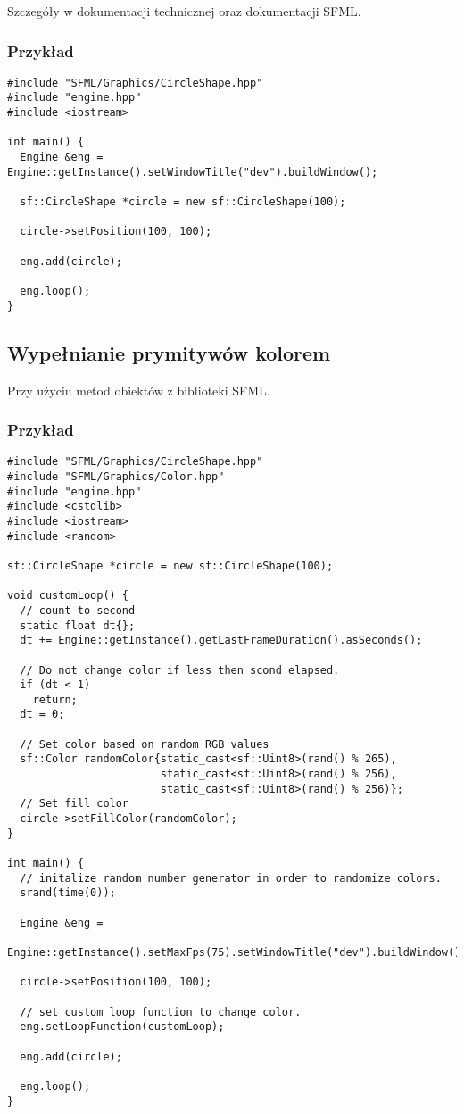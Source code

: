 \documentclass[11pt]{article}
\begin{document}
Szczegóły w dokumentacji technicznej oraz dokumentacji SFML.
\subsubsection{Przykład}
\label{sec:org96bf344}
\begin{verbatim}
#include "SFML/Graphics/CircleShape.hpp"
#include "engine.hpp"
#include <iostream>

int main() {
  Engine &eng = Engine::getInstance().setWindowTitle("dev").buildWindow();

  sf::CircleShape *circle = new sf::CircleShape(100);

  circle->setPosition(100, 100);

  eng.add(circle);

  eng.loop();
}
\end{verbatim}
\subsection{Wypełnianie prymitywów kolorem}
\label{sec:org820a780}
Przy użyciu metod obiektów z biblioteki SFML.
\subsubsection{Przykład}
\label{sec:org1ca8fe5}
\begin{verbatim}
#include "SFML/Graphics/CircleShape.hpp"
#include "SFML/Graphics/Color.hpp"
#include "engine.hpp"
#include <cstdlib>
#include <iostream>
#include <random>

sf::CircleShape *circle = new sf::CircleShape(100);

void customLoop() {
  // count to second
  static float dt{};
  dt += Engine::getInstance().getLastFrameDuration().asSeconds();

  // Do not change color if less then scond elapsed.
  if (dt < 1)
    return;
  dt = 0;

  // Set color based on random RGB values
  sf::Color randomColor{static_cast<sf::Uint8>(rand() % 265),
                        static_cast<sf::Uint8>(rand() % 256),
                        static_cast<sf::Uint8>(rand() % 256)};
  // Set fill color
  circle->setFillColor(randomColor);
}

int main() {
  // initalize random number generator in order to randomize colors.
  srand(time(0));

  Engine &eng =
      Engine::getInstance().setMaxFps(75).setWindowTitle("dev").buildWindow();

  circle->setPosition(100, 100);

  // set custom loop function to change color.
  eng.setLoopFunction(customLoop);

  eng.add(circle);

  eng.loop();
}
\end{verbatim}
\end{document}
